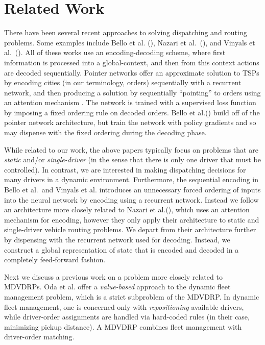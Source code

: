 \section{Related Work}

There have been several recent approaches to solving dispatching and routing problems. Some examples include Bello et al. (\cite{bello2016neural}), Nazari et al.~(\cite{nazari2018deep}), and Vinyals et al.~(\cite{vinyals2015pointer}). All of these works use an encoding-decoding scheme, where first information is processed into a global-context, and then from this context actions are decoded sequentially. Pointer networks \cite{vinyals2015pointer} offer an approximate solution to TSPs by encoding cities (in our terminology, orders) sequentially with a recurrent network, and then producing a solution by sequentially ``pointing'' to orders using an attention mechanism \cite{mnih2014recurrent}. The network is trained with a supervised loss function by imposing a fixed ordering rule on decoded orders. Bello et al.(\cite{bello2016neural}) build off of the pointer network architecture, but train the network with policy gradients and so may dispense with the fixed ordering during the decoding phase. 


While related to our work, the above papers typically focus on problems that are {\em static} and/or {\em single-driver} (in the sense that there is only one driver that must be controlled). In contrast, we are interested in making dispatching decisions for many drivers in a dynamic environment. Furthermore, the sequential encoding in Bello et al.~and Vinyals et al. introduces an unnecessary forced ordering of inputs into the neural network by encoding using a recurrent network. Instead we follow an architecture more closely related to Nazari et al.(\cite{nazari2018deep}), which uses an attention mechanism \cite{mnih2014recurrent} for encoding, however they only apply their architecture to static and single-driver vehicle routing problems. We depart from their architecture further by dispensing with the recurrent network used for decoding. Instead, we construct a global representation of state that is encoded and decoded in a completely feed-forward fashion.

Next we discuss a previous work on a problem more closely related to MDVDRPs. Oda et al. \cite{oda2018movi} offer a {\em value-based} approach to the  dynamic fleet management problem, which is a strict subproblem of the MDVDRP. In dynamic fleet management, one is concerned only with {\em repositioning} available drivers, while driver-order assignments are handled via hard-coded rules (in their case, minimizing pickup distance). A MDVDRP combines fleet management with driver-order matching.

